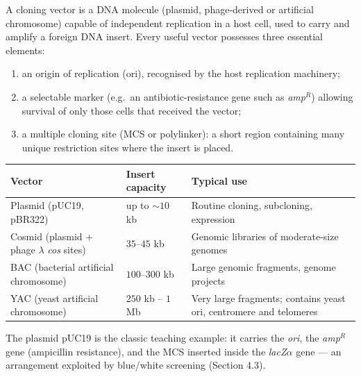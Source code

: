 \documentclass[11pt]{article}
\newcommand{\cle}[1]{{\popxbold\color{popdark}#1}}
\begin{document}
\begin{definition}
A \cle{cloning vector} is a DNA molecule (plasmid, phage-derived or artificial chromosome) capable of independent replication in a host cell, used to carry and amplify a foreign DNA insert. Every useful vector possesses three essential elements:
\begin{enumerate}
\item an \cle{origin of replication} (ori), recognised by the host replication machinery;
\item a \cle{selectable marker} (e.g.\ an antibiotic-resistance gene such as \emph{amp}$^R$) allowing survival of only those cells that received the vector;
\item a \cle{multiple cloning site} (MCS or polylinker): a short region containing many unique restriction sites where the insert is placed.
\end{enumerate}
\end{definition}

\begin{center}
\begin{tabularx}{\linewidth}{|l|X|X|}
\hline
\rowcolor{popblueL} \textbf{Vector} & \textbf{Insert capacity} & \textbf{Typical use} \\
\hline
Plasmid (pUC19, pBR322) & up to $\sim 10$ kb & Routine cloning, subcloning, expression \\
\hline
Cosmid (plasmid + phage $\lambda$ \emph{cos} sites) & $35$--$45$ kb & Genomic libraries of moderate-size genomes \\
\hline
BAC (bacterial artificial chromosome) & $100$--$300$ kb & Large genomic fragments, genome projects \\
\hline
YAC (yeast artificial chromosome) & $250$ kb -- $1$ Mb & Very large fragments; contains yeast ori, centromere and telomeres \\
\hline
\end{tabularx}
\end{center}

The plasmid \cle{pUC19} is the classic teaching example: it carries the \emph{ori}, the \emph{amp}$^R$ gene (ampicillin resistance), and the MCS inserted inside the \emph{lacZ}$\alpha$ gene --- an arrangement exploited by blue/white screening (Section 4.3).
\end{document}
